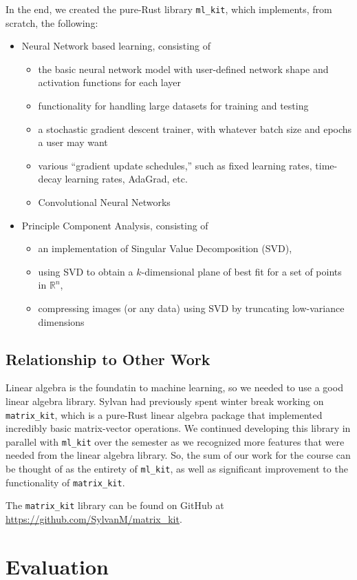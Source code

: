 \documentclass[12pt, letterpaper]{article}
\theoremstyle{definition}
\theoremstyle{remark}
\newcommand{\R}{\mathbb{R}}
\begin{document}
In the end, we created the pure-Rust library \texttt{ml\_kit}, which implements, from scratch, the following:
\begin{itemize}
    \item Neural Network based learning, consisting of
    \begin{itemize}
        \item the basic neural network model with user-defined network shape and activation functions 
        for each layer
        \item functionality for handling large datasets for training and testing
        \item a stochastic gradient descent trainer, with whatever batch size and epochs a user may want
        \item various ``gradient update schedules,'' such as fixed learning rates, time-decay learning rates, AdaGrad, etc.
        \item Convolutional Neural Networks
    \end{itemize}
    \item Principle Component Analysis, consisting of
    \begin{itemize}
        \item an implementation of Singular Value Decomposition (SVD),
        \item using SVD to obtain a $k$-dimensional plane of best fit for a set of points in $\R^n$,
        \item compressing images (or any data) using SVD by truncating low-variance dimensions
    \end{itemize}
\end{itemize}





\subsection{Relationship to Other Work}

Linear algebra is the foundatin to machine learning, so we needed to use a good linear algebra library. Sylvan had 
previously spent winter break working on \texttt{matrix\_kit}, which is a pure-Rust linear algebra package that 
implemented incredibly basic matrix-vector operations. We continued developing this library in parallel with 
\texttt{ml\_kit} over the semester as we recognized more features that were needed from the linear algebra library. 
So, the sum of our work for the course can be thought of as the entirety of \texttt{ml\_kit}, as well as significant
improvement to the functionality of \texttt{matrix\_kit}.

The \texttt{matrix\_kit} library can be found on GitHub at \url{https://github.com/SylvanM/matrix_kit}.

\section{Evaluation}





\printbibliography
\end{document}
